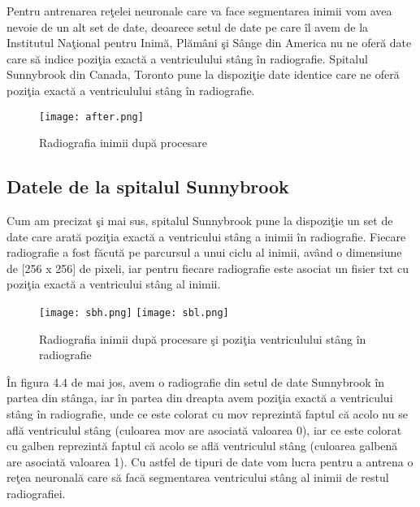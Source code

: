 \par

Pentru antrenarea re\c{t}elei neuronale care va face segmentarea inimii vom avea nevoie de un alt set de date, deoarece setul de date pe care \^{i}l avem de la Institutul Na\c{t}ional pentru Inim\u{a}, Pl\u{a}m\^{a}ni \c{s}i S\^{a}nge din America nu ne ofer\u{a} date care s\u{a} indice pozi\c{t}ia exact\u{a} a ventriculului st\^{a}ng \^{i}n radiografie. Spitalul Sunnybrook din Canada, Toronto pune la dispozi\c{t}ie date identice care ne ofer\u{a} pozi\c{t}ia exact\u{a} a ventriculului st\^{a}ng \^{i}n radiografie.

\begin{figure}[h!]
  \center
  \texttt{[image: after.png]}
  \caption{Radiografia inimii dup\u{a} procesare}
\end{figure}

\subsection{Datele de la spitalul Sunnybrook}

Cum am precizat \c{s}i mai sus, spitalul Sunnybrook pune la dispozi\c{t}ie un set de date care arat\u{a} pozi\c{t}ia exact\u{a} a ventricului st\^{a}ng a inimii \^{i}n radiografie. Fiecare radiografie a fost f\u{a}cut\u{a} pe parcursul a unui ciclu al inimii, av\^{a}nd o dimensiune de [256 x 256] de pixeli, iar pentru fiecare radiografie este asociat  un fisier txt cu pozi\c{t}ia exact\u{a} a ventricului st\^{a}ng al inimii.

\begin{figure}[h!]
  \center
  \texttt{[image: sbh.png]}
  \texttt{[image: sbl.png]}
  \caption{Radiografia inimii dup\u{a} procesare \c{s}i pozi\c{t}ia ventriculului st\^{a}ng \^{i}n radiografie}
\end{figure}

\^{I}n figura 4.4 de mai jos, avem o radiografie din setul de date Sunnybrook \^{i}n partea din st\^{a}nga, iar \^{i}n partea din dreapta avem pozi\c{t}ia exact\u{a} a ventricului st\^{a}ng \^{i}n radiografie, unde ce este colorat cu mov reprezint\u{a} faptul c\u{a} acolo nu se afl\u{a} ventriculul st\^{a}ng (culoarea mov are asociat\u{a} valoarea 0), iar ce este colorat cu galben reprezint\u{a} faptul c\u{a} acolo se afl\u{a} ventriculul st\^{a}ng (culoarea galben\u{a} are asociat\u{a} valoarea 1). Cu astfel de tipuri de date vom lucra pentru a antrena o re\c{t}ea neuronal\u{a} care s\u{a} fac\u{a} segmentarea ventricului st\^{a}ng al inimii de restul radiografiei. 


